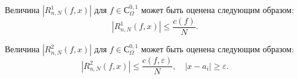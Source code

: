 \begin{lemma}\label{lemma:R1_estimate}
	Величина $\left|R_{n,N}^1(f,x) \right|$ для $f \in С^{0,1}_\Omega$ может быть оценена следующим образом:
	\begin{equation*}
	\left| R_{n,N}^1 (f,x) \right| \leq \frac{c(f)}{N}.
	\end{equation*}
\end{lemma}

\begin{lemma}\label{lemma:R2_estimate}
	Величина $\left|R_{n,N}^2(f,x) \right|$ для $f \in С^{0,1}_\Omega$ может быть оценена следующим образом:
	\begin{equation*}
	\left| R_{n,N}^2 (f,x) \right| \leq \frac{c(f,\varepsilon)}{N}, \quad \left|x - a_i\right| \geq \varepsilon.
	\end{equation*}
\end{lemma}

